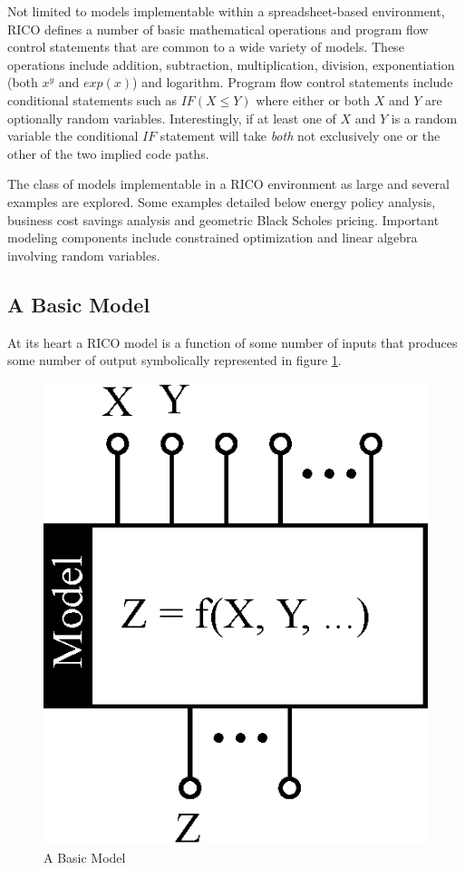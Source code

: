 Not limited to models implementable within a spreadsheet-based environment, RICO defines a number of basic mathematical operations and program flow control statements that are common to a wide variety of models. These operations include addition, subtraction, multiplication, division, exponentiation (both $x^y$ and $exp(x)$) and logarithm. Program flow control statements include conditional statements such as $IF(X \le Y)$ where either or both $X$ and $Y$ are optionally random variables. Interestingly, if at least one of $X$ and $Y$ is a random variable the conditional $IF$ statement will take \emph{both} not exclusively one or the other of the two implied code paths.

The class of models implementable in a RICO environment as large and several examples are explored. Some examples detailed below energy policy analysis, business cost savings analysis and geometric Black Scholes pricing. Important modeling components include constrained optimization and linear algebra involving random variables.


\subsection{A Basic Model}

At its heart a RICO model is a function of some number of inputs that produces some number of output symbolically represented in figure \ref{fig:BasicModel}.

\begin{figure}
  \centering
  \includegraphics{Images/BasicModel.eps}
  \caption[A Basic Model]
          {A Basic Model}
  \label{fig:BasicModel}
\end{figure}

